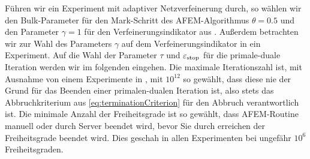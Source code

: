 Führen wir ein Experiment mit adaptiver Netzverfeinerung durch, so wählen wir
den Bulk-Parameter für den Mark-Schritt des AFEM-Algorithmus $\theta=0.5$ und
den Parameter $\gamma=1$ für den Verfeinerungsindikator aus 
.
Außerdem betrachten wir zur Wahl des Parameters $\gamma$ auf dem
Verfeinerungsindikator in  ein
Experiment.
Auf die Wahl der Parameter $\tau$ und $\varepsilon_{\textup{stop}}$ für die primale-duale
Iteration werden wir im folgenden  eingehen.
Die maximale Iterationszahl ist, mit Ausnahme von einem Experimente in
, mit $10^{12}$ so gewählt, dass diese nie 
der Grund für das Beenden einer primalen-dualen Iteration ist, also stets das
Abbruchkriterium aus \eqref{eq:terminationCriterion} für den Abbruch
verantwortlich ist.
Die minimale Anzahl der Freiheitsgrade ist so gewählt, dass AFEM-Routine
manuell oder durch Server beendet wird, bevor Sie durch erreichen 
der Freiheitsgrade beendet wird. Dies geschah in allen Experimenten bei 
ungefähr $10^6$ Freiheitsgraden.

